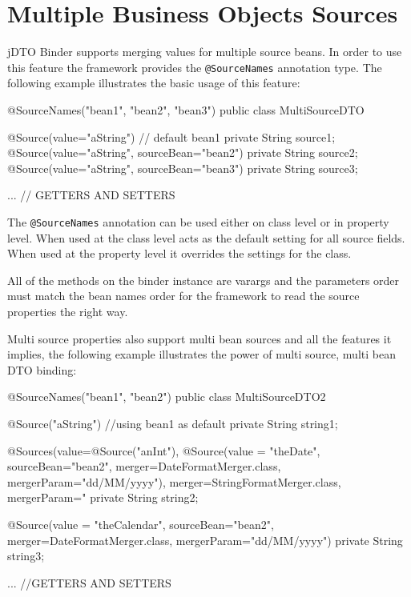 \documentclass[11pt]{article}
\newcommand{\JDTO}{jDTO Binder\xspace}
\begin{document}
\section{Multiple Business Objects Sources}

\JDTO supports merging values for multiple source beans. In order to use this feature the framework provides the \texttt{@SourceNames} annotation type. The following example illustrates the basic usage of this feature:



\begin{java}
@SourceNames({"bean1", "bean2", "bean3"})
public class MultiSourceDTO {
    
    @Source(value="aString") // default bean1
    private String source1;
    @Source(value="aString", sourceBean="bean2")
    private String source2;
    @Source(value="aString", sourceBean="bean3")
    private String source3;
    
    ... // GETTERS AND SETTERS
}
\end{java}

The \texttt{@SourceNames} annotation can be used either on class level or in property level. When used at the class level acts as the default setting for all source fields. When used at the property level it overrides the settings for the class.

All of the methods on the binder instance are varargs and the parameters order must match the bean names order for the framework to read the source properties the right way.

Multi source properties also support multi bean sources and all the features it implies, the following example illustrates the power of multi source, multi bean DTO binding:


\begin{java}
@SourceNames({"bean1", "bean2"})
public class MultiSourceDTO2 {
    @Source("aString") //using bean1 as default
    private String string1;
    
    @Sources(value={@Source("anInt"), 
            @Source(value = "theDate", 
            sourceBean="bean2", 
            merger=DateFormatMerger.class, 
            mergerParam="dd/MM/yyyy")}, 
        merger=StringFormatMerger.class, mergerParam="%
    private String string2;
    
    @Source(value = "theCalendar", sourceBean="bean2", 
        merger=DateFormatMerger.class, mergerParam="dd/MM/yyyy")
    private String string3;

    ... //GETTERS AND SETTERS
}
\end{java}
\end{document}
